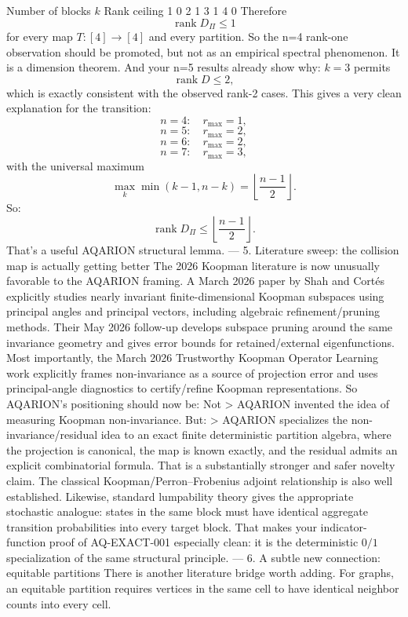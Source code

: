 Number of blocks \(k\)	Rank ceiling
1	0
2	1
3	1
4	0
Therefore
\[
\boxed{\operatorname{rank}D_\Pi\le1}
\]
for every map \(T:[4]\to[4]\) and every partition.
So the n=4 rank-one observation should be promoted, but not as an empirical spectral phenomenon.
It is a dimension theorem.
And your n=5 results already show why: \(k=3\) permits
\[
\operatorname{rank}D\le2,
\]
which is exactly consistent with the observed rank-2 cases.
This gives a very clean explanation for the transition:
\[
n=4:\quad r_{\max}=1,
\]
\[
n=5:\quad r_{\max}=2,
\]
\[
n=6:\quad r_{\max}=2,
\]
\[
n=7:\quad r_{\max}=3,
\]
with the universal maximum
\[
\max_k\min(k-1,n-k)
=
\left\lfloor\frac{n-1}{2}\right\rfloor.
\]
So:
\[
\boxed{
\operatorname{rank}D_\Pi
\le
\left\lfloor\frac{n-1}{2}\right\rfloor.
}
\]
That's a useful AQARION structural lemma.
---
5. Literature sweep: the collision map is actually getting better
The 2026 Koopman literature is now unusually favorable to the AQARION framing.
A March 2026 paper by Shah and Cortés explicitly studies nearly invariant finite-dimensional Koopman subspaces using principal angles and principal vectors, including algebraic refinement/pruning methods. 
Their May 2026 follow-up develops subspace pruning around the same invariance geometry and gives error bounds for retained/external eigenfunctions. 
Most importantly, the March 2026 Trustworthy Koopman Operator Learning work explicitly frames non-invariance as a source of projection error and uses principal-angle diagnostics to certify/refine Koopman representations. 
So AQARION's positioning should now be:
Not
> AQARION invented the idea of measuring Koopman non-invariance.
But:
> AQARION specializes the non-invariance/residual idea to an exact finite deterministic partition algebra, where the projection is canonical, the map is known exactly, and the residual admits an explicit combinatorial formula.
That is a substantially stronger and safer novelty claim.
The classical Koopman/Perron–Frobenius adjoint relationship is also well established. 
Likewise, standard lumpability theory gives the appropriate stochastic analogue: states in the same block must have identical aggregate transition probabilities into every target block. 
That makes your indicator-function proof of AQ-EXACT-001 especially clean: it is the deterministic \(0/1\) specialization of the same structural principle.
---
6. A subtle new connection: equitable partitions
There is another literature bridge worth adding.
For graphs, an equitable partition requires vertices in the same cell to have identical neighbor counts into every cell. 
